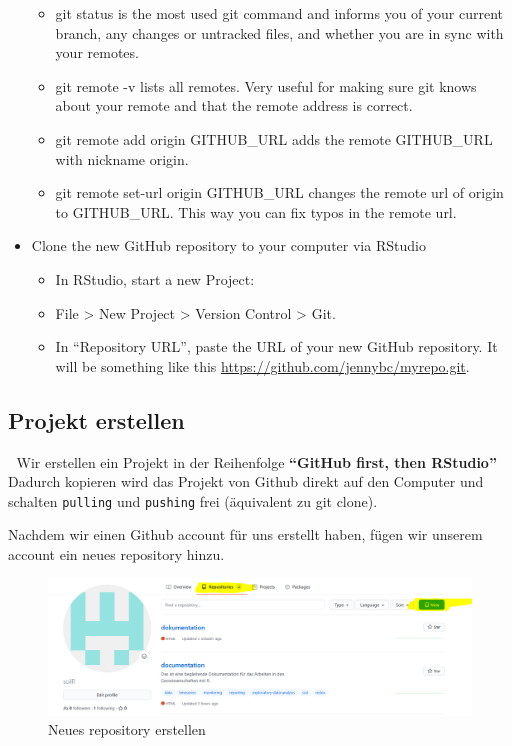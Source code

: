 \documentclass[
]{article}
\providecommand{\tightlist}{%
  \setlength{\itemsep}{0pt}\setlength{\parskip}{0pt}}
\begin{document}
\begin{itemize}
  \begin{itemize}
  \tightlist
  \item
    git status is the most used git command and informs you of your
    current branch, any changes or untracked files, and whether you
    are in sync with your remotes.
  \item
    git remote -v lists all remotes. Very useful for making sure git
    knows about your remote and that the remote address is correct.
  \item
    git remote add origin GITHUB\_URL adds the remote GITHUB\_URL with
    nickname origin.
  \item
    git remote set-url origin GITHUB\_URL changes the remote url of
    origin to GITHUB\_URL. This way you can fix typos in the remote
    url.
  \end{itemize}
\item
  Clone the new GitHub repository to your computer via RStudio

  \begin{itemize}
  \tightlist
  \item
    In RStudio, start a new Project:
  \item
    File \textgreater{} New Project \textgreater{} Version Control \textgreater{} Git.
  \item
    In ``Repository URL'', paste the URL of your new GitHub
    repository. It will be something like this
    \url{https://github.com/jennybc/myrepo.git}.
  \end{itemize}
\end{itemize}

\hypertarget{projekt-erstellen}{%
\subsection{Projekt erstellen}\label{projekt-erstellen}}

🚨 Wir erstellen ein Projekt in der Reihenfolge \textbf{``GitHub first, then
RStudio''} Dadurch kopieren wird das Projekt von Github direkt auf den Computer und schalten \texttt{pulling} und \texttt{pushing} frei (äquivalent zu git clone).

Nachdem wir einen Github account für uns erstellt haben, fügen wir unserem account ein neues repository hinzu.

\begin{figure}

{\centering \includegraphics[width=1\linewidth]{images/077} 

}

\caption{Neues repository erstellen}\label{fig:unnamed-chunk-299}
\end{figure}
\end{document}
